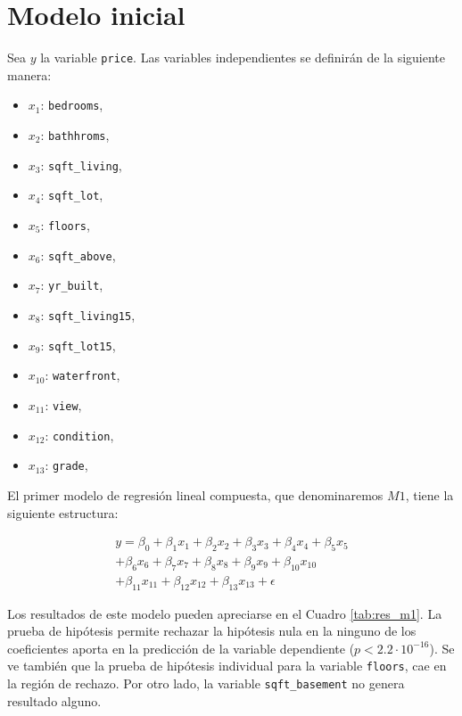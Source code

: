 \documentclass[10pt,letterpaper]{article}
\begin{document}
\section{Modelo inicial}
Sea $y$ la variable \texttt{price}. Las variables independientes se definirán de la siguiente manera:
\begin{itemize}
	\item $x_{1}$: \texttt{bedrooms},
	\item $x_{2}$: \texttt{bathhroms},
	\item $x_{3}$: \texttt{sqft\_living},
	\item $x_{4}$: \texttt{sqft\_lot},
	\item $x_{5}$: \texttt{floors},
	\item $x_{6}$: \texttt{sqft\_above}, 
	\item $x_{7}$: \texttt{yr\_built}, 
	\item $x_{8}$: \texttt{sqft\_living15}, 
	\item $x_{9}$: \texttt{sqft\_lot15},
	\item $x_{10}$: \texttt{waterfront}, 
	\item $x_{11}$: \texttt{view},
	\item $x_{12}$: \texttt{condition},
	\item $x_{13}$: \texttt{grade},
\end{itemize}

El primer modelo de regresión lineal compuesta, que denominaremos $M1$, tiene la siguiente estructura:

\begin{multline}
	y = \beta_{0}
	+ \beta_{1} x_{1}
	+ \beta_{2} x_{2}
	+ \beta_{3} x_{3}
	+ \beta_{4} x_{4}
	+ \beta_{5} x_{5}\\
	+ \beta_{6} x_{6}
	+ \beta_{7} x_{7}
	+ \beta_{8} x_{8}
	+ \beta_{9} x_{9}
	+ \beta_{10} x_{10}\\
	+ \beta_{11} x_{11}
	+ \beta_{12} x_{12}
	+ \beta_{13} x_{13} + \epsilon
\end{multline}

Los resultados de este modelo pueden apreciarse en el Cuadro \ref{tab:res_m1}. La prueba de hipótesis permite rechazar la hipótesis nula en la ninguno de los coeficientes aporta en la predicción de la variable dependiente ($p<2.2\cdot 10^{-16}$). Se ve también que la prueba de hipótesis individual para la variable {\tt floors}, cae en la región de rechazo. Por otro lado, la variable {\tt sqft\_basement} no genera resultado alguno.
\end{document}
